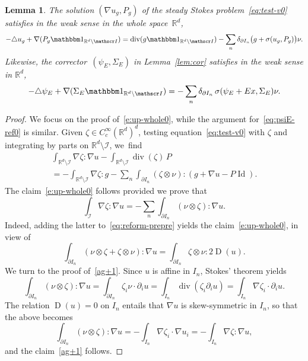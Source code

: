 \documentclass[10pt]{amsart}
\let\mathcal\mathscr
\let\mathds\mathbbm
\theoremstyle{plain}
\newtheorem{lem}[theor]{Lemma}
\theoremstyle{definition}
\newcommand{\R}{\mathbb R}
\newcommand{\Ic}{\mathcal I}
\newcommand{\Id}{\operatorname{Id}}
\newcommand{\D}{\operatorname{D}}
\newcommand{\Div}{{\operatorname{div}}}
\begin{document}
\begin{lem}\label{lem:reform-whole}
The solution $(\nabla u_g,P_g)$ of the steady Stokes problem~\eqref{eq:test-v0} satisfies in the weak sense in the whole space~$\R^d$,
\begin{equation}\label{e:up-whole0}
-\triangle u_g+\nabla (P_g\mathds1_{\R^d\setminus\Ic})=\Div(g\mathds1_{\R^d\setminus\Ic})-\sum_{n} \delta_{\partial I_n}\big(g+\sigma(u_g,P_g)\big)\nu.
\end{equation}
Likewise, the corrector~$(\psi_E,\Sigma_E)$ in Lemma~\ref{lem:cor} satisfies in the weak sense in $\R^d$,
\begin{equation}\label{eq:psiE-ref0}
-\triangle\psi_E+\nabla(\Sigma_E\mathds1_{{\R^d\setminus\Ic}})=-\sum_n\delta_{\partial I_n}\,\sigma(\psi_E+Ex,\Sigma_E)\nu.
\qedhere
\end{equation}
\end{lem}

\begin{proof}
We focus on the proof of~\eqref{e:up-whole0}, while the argument for~\eqref{eq:psiE-ref0} is similar.
Given $\zeta\in C^\infty_c(\R^d)^d$, testing equation~\eqref{eq:test-v0} with $\zeta$ and integrating by parts on ${\R^d\setminus\Ic}$, we~find
\begin{multline}\label{eq:reform-prepre}
\int_{{\R^d\setminus\Ic}}\nabla\zeta:\nabla u - \int_{{\R^d\setminus\Ic}}\Div(\zeta)\,P
\\
=-\int_{\R^d\setminus\Ic}\nabla\zeta: g-\sum_{n}\int_{\partial I_{n}}(\zeta\otimes\nu):(g+\nabla u-P\Id).
\end{multline}
The claim~\eqref{e:up-whole0} follows provided we prove that
\begin{equation}\label{ag+1}
\int_{\Ic}\nabla\zeta:\nabla u =-\sum_{n}\int_{\partial I_{n}}(\nu \otimes \zeta):\nabla u.
\end{equation}
Indeed, adding the latter to~\eqref{eq:reform-prepre} yields the claim~\eqref{e:up-whole0}, in view of
\[\int_{\partial I_{n}}(\nu \otimes \zeta+\zeta\otimes\nu):\nabla u=\int_{\partial I_{n}}\zeta\otimes\nu:2\D(u).\]
We turn to the proof of~\eqref{ag+1}.
Since $u$ is affine in $I_{n}$, Stokes' theorem yields
\[\int_{\partial I_{n}}(\nu\otimes\zeta):\nabla u=\int_{\partial I_{n}}\zeta_i\nu\cdot\partial_iu=\int_{I_{n}}\Div(\zeta_i\partial_iu)=\int_{I_{n}}\nabla\zeta_i\cdot\partial_iu.\]
The relation $\D(u)=0$ on $I_{n}$ entails that $\nabla u$ is skew-symmetric in $I_n$, so that the above becomes
\[\int_{\partial I_{n}}(\nu\otimes\zeta):\nabla u=-\int_{I_{n}}\nabla\zeta_i\cdot\nabla u_i=-\int_{I_{n}}\nabla\zeta:\nabla u,\]
and the claim~\eqref{ag+1} follows.
\end{proof}
\end{document}
